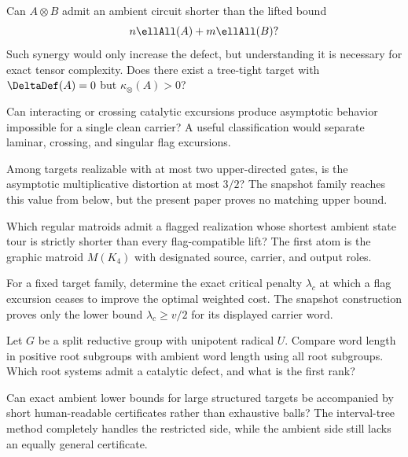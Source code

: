\begin{question}
Can $A\otimes B$ admit an ambient circuit shorter than the lifted bound
\[
n\ellAll(A)+m\ellAll(B)?
\]
Such synergy would only increase the defect, but understanding it is necessary for exact tensor complexity.  Does there exist a tree-tight target with $\DeltaDef(A)=0$ but $\kappa_\otimes(A)>0$?
\end{question}

\begin{question}
Can interacting or crossing catalytic excursions produce asymptotic behavior impossible for a single clean carrier?  A useful classification would separate laminar, crossing, and singular flag excursions.
\end{question}

\begin{question}
Among targets realizable with at most two upper-directed gates, is the asymptotic multiplicative distortion at most $3/2$?  The snapshot family reaches this value from below, but the present paper proves no matching upper bound.
\end{question}

\begin{question}
Which regular matroids admit a flagged realization whose shortest ambient state tour is strictly shorter than every flag-compatible lift?  The first atom is the graphic matroid $M(K_4)$ with designated source, carrier, and output roles.
\end{question}

\begin{question}
For a fixed target family, determine the exact critical penalty $\lambda_c$ at which a flag excursion ceases to improve the optimal weighted cost.  The snapshot construction proves only the lower bound $\lambda_c\ge v/2$ for its displayed carrier word.
\end{question}

\begin{question}
Let $G$ be a split reductive group with unipotent radical $U$.  Compare word length in positive root subgroups with ambient word length using all root subgroups.  Which root systems admit a catalytic defect, and what is the first rank?
\end{question}

\begin{question}
Can exact ambient lower bounds for large structured targets be accompanied by short human-readable certificates rather than exhaustive balls?  The interval-tree method completely handles the restricted side, while the ambient side still lacks an equally general certificate.
\end{question}


